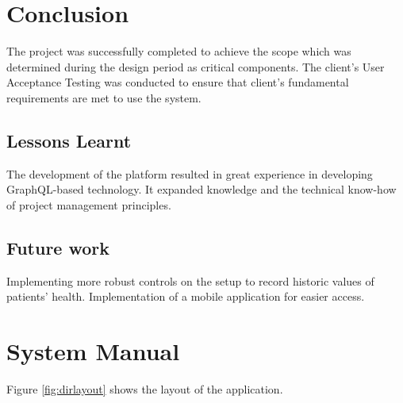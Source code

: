 \documentclass[12pt,a4paper]{report}
\begin{document}


\chapter{Conclusion}

The project was successfully completed to achieve the scope which was determined during the design period as critical components. The client’s User Acceptance Testing was conducted to ensure that client's fundamental requirements are met to use the system.

\section{Lessons Learnt}

The development of the platform resulted in great experience in developing GraphQL-based technology. It expanded knowledge and the technical know-how of project management principles. 

\section{Future work}

Implementing more robust controls on the setup to record historic values of patients' health. 
Implementation of a mobile application for easier access. 



\appendix
{}
\chapter{System Manual}

Figure \ref{fig:dirlayout} shows the layout of the application. \\ 
\end{document}

